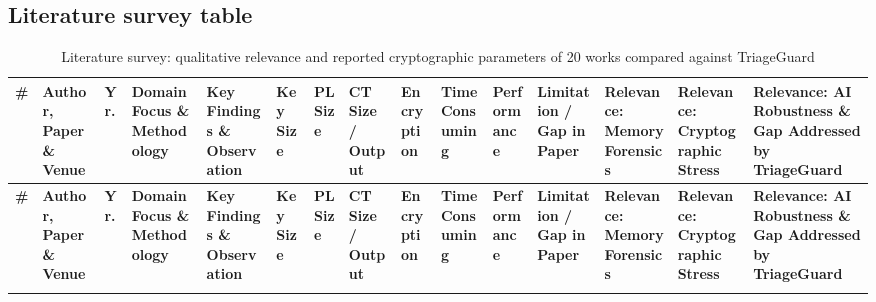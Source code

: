 \onecolumn
\begin{landscape}
\section{Literature survey table}
\label{app:survey}
{\tiny
\setlength{\tabcolsep}{2pt}
\renewcommand{\arraystretch}{1.15}
\setlength{\svw}{\dimexpr\linewidth-60pt\relax}
\begin{longtable}{W{.02}W{.11}W{.025}W{.09}W{.09}W{.06}W{.05}W{.055}W{.06}W{.055}W{.06}W{.08}W{.075}W{.08}W{.09}}
\caption{Literature survey: qualitative relevance and reported cryptographic parameters of 20 works compared against TriageGuard}
\label{tab:survey} \\
\toprule
\textbf{\#} & \textbf{Author, Paper \& Venue} & \textbf{Yr.} & \textbf{Domain Focus \& Methodology} & \textbf{Key Findings \& Observation} & \textbf{Key Size} & \textbf{PL Size} & \textbf{CT Size / Output} & \textbf{Encryption} & \textbf{Time Consuming} & \textbf{Performance} & \textbf{Limitation / Gap in Paper} & \textbf{Relevance: Memory Forensics} & \textbf{Relevance: Cryptographic Stress} & \textbf{Relevance: AI Robustness \& Gap Addressed by TriageGuard} \\
\midrule
\endfirsthead
\toprule
\textbf{\#} & \textbf{Author, Paper \& Venue} & \textbf{Yr.} & \textbf{Domain Focus \& Methodology} & \textbf{Key Findings \& Observation} & \textbf{Key Size} & \textbf{PL Size} & \textbf{CT Size / Output} & \textbf{Encryption} & \textbf{Time Consuming} & \textbf{Performance} & \textbf{Limitation / Gap in Paper} & \textbf{Relevance: Memory Forensics} & \textbf{Relevance: Cryptographic Stress} & \textbf{Relevance: AI Robustness \& Gap Addressed by TriageGuard} \\
\midrule
\endhead
\bottomrule
\endfoot
\bottomrule
\endlastfoot

\end{longtable}
}
\end{landscape}
